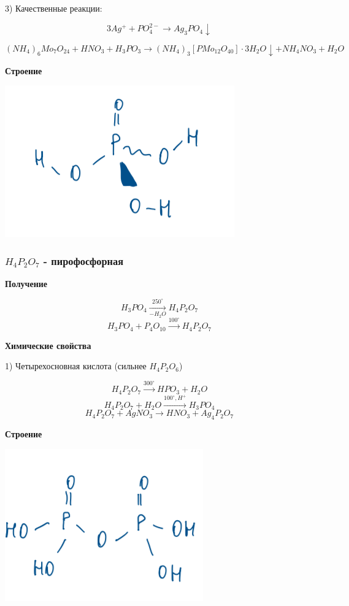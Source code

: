 3) Качественные реакции:

$$3Ag^+ + PO_4^{2-} \rightarrow Ag_3PO_4\downarrow$$

$$(NH_4)_6Mo_7O_24 + HNO_3 + H_3PO_3 \rightarrow (NH_4)_3[PMo_12O_40]\cdot 3H_2O\downarrow + NH_4NO_3 + H_2O$$

\textbf{Строение}

\includegraphics{images/9v11.png}

\subsubsection*{$H_4P_2O_7$ - пирофосфорная}

\textbf{Получение}

$$H_3PO_4 \xrightarrow[-H_2O]{250^{\circ}} H_4P_2O_7$$
$$H_3PO_4 + P_4O_{10} \xrightarrow{100^{\circ}} H_4P_2O_7$$

\textbf{Химические свойства}

1) Четырехосновная кислота (сильнее $H_4P_2O_6$)

$$H_4P_2O_7 \xrightarrow{300^{\circ}} HPO_3 + H_2O$$
$$H_4P_2O_7 + H_2O \xrightarrow{100^{\circ}, H^+} H_3PO_4$$
$$H_4P_2O_7 + AgNO_3 \rightarrow HNO_3 + Ag_4P_2O_7$$

\textbf{Строение}

\includegraphics{images/9v12.png}

